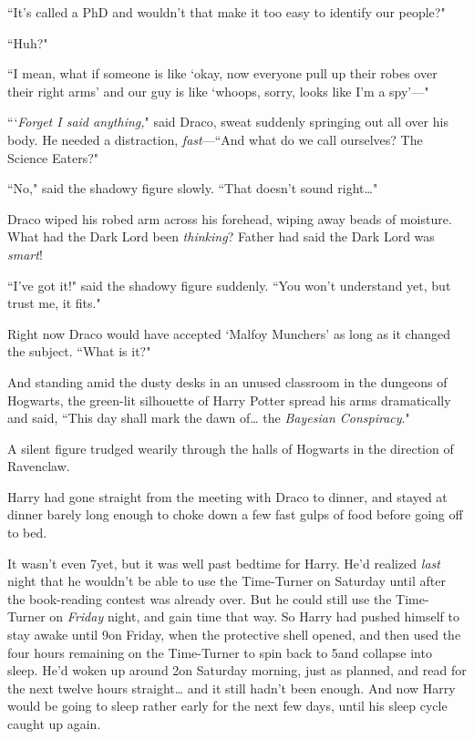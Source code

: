 ``It's called a PhD and wouldn't that make it too easy to identify our people?"

``Huh?"

``I mean, what if someone is like `okay, now everyone pull up their robes over their right arms' and our guy is like `whoops, sorry, looks like I'm a spy'—"

```\emph{Forget I said anything,}" said Draco, sweat suddenly springing out all over his body. He needed a distraction, \emph{fast}—``And what do we call ourselves? The Science Eaters?"

``No," said the shadowy figure slowly. ``That doesn't sound right{\ldots}"

Draco wiped his robed arm across his forehead, wiping away beads of moisture. What had the Dark Lord been \emph{thinking}? Father had said the Dark Lord was \emph{smart}!

``I've got it!" said the shadowy figure suddenly. ``You won't understand yet, but trust me, it fits."

Right now Draco would have accepted `Malfoy Munchers' as long as it changed the subject. ``What is it?"

And standing amid the dusty desks in an unused classroom in the dungeons of Hogwarts, the green-lit silhouette of Harry Potter spread his arms dramatically and said, ``This day shall mark the dawn of{\ldots} the \emph{Bayesian Conspiracy}."

\later

A silent figure trudged wearily through the halls of Hogwarts in the direction of Ravenclaw.

Harry had gone straight from the meeting with Draco to dinner, and stayed at dinner barely long enough to choke down a few fast gulps of food before going off to bed.

It wasn't even 7\pm yet, but it was well past bedtime for Harry. He'd realized \emph{last} night that he wouldn't be able to use the Time-Turner on Saturday until after the book-reading contest was already over. But he could still use the Time-Turner on \emph{Friday} night, and gain time that way. So Harry had pushed himself to stay awake until 9\pm on Friday, when the protective shell opened, and then used the four hours remaining on the Time-Turner to spin back to 5\pm and collapse into sleep. He'd woken up around 2\am on Saturday morning, just as planned, and read for the next twelve hours straight{\ldots} and it still hadn't been enough. And now Harry would be going to sleep rather early for the next few days, until his sleep cycle caught up again.


